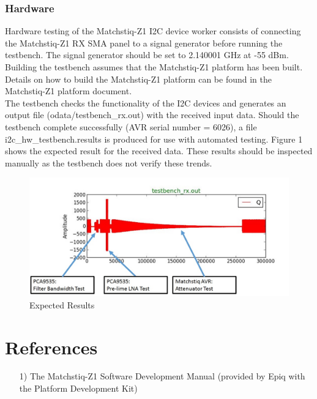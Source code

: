 \documentclass{article}
\begin{document}
\subsubsection*{Hardware}
\begin{flushleft}
Hardware testing of the Matchstiq-Z1 I2C device worker consists of connecting the Matchstiq-Z1 RX SMA panel to a signal generator before running the testbench.
The signal generator should be set to 2.140001 GHz at -55 dBm.\\
Building the testbench assumes that the Matchstiq-Z1 platform has been built. Details on how to build the Matchstiq-Z1 platform can be found in the Matchstiq-Z1 platform document.\\
The testbench checks the functionality of the I2C devices and generates an output file (odata/testbench\_rx.out) with the received input data. Should the testbench complete successfully (AVR serial number = 6026), a file i2c\_hw\_testbench.results is produced for use with automated testing. Figure 1 shows the expected result for the received data. These results should be inspected manually as the testbench does not verify these trends.\par\bigskip
	\begin{figure}[ht]
		\centerline{\includegraphics[scale=0.5]{testbench_rx}}
		\caption{Expected Results}
		\label{fig:tb}
	\end{figure}
\end{flushleft}

\section*{References}
\begin{flushleft}
	\begin{itemize}
		\item[1)] The Matchstiq-Z1 Software Development Manual (provided by Epiq with the Platform Development Kit)
	\end{itemize}
\end{flushleft}
\end{document}
